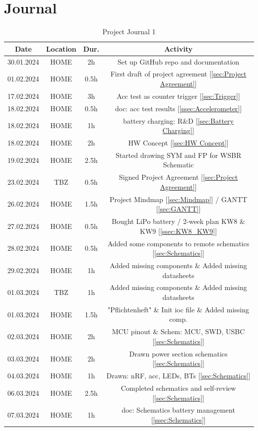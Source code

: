 \section{Journal}
\label{sec:Journal}
\begin{table}[H]
    \centering
\begin{tabular}{||c | c | c || c||} 
 \hline
 Date &  Location & Dur. & Activity \\ [0.5ex] 
 \hline\hline
    30.01.2024 & HOME & 2h & Set up GitHub repo and documentation \\   
 \hline
    01.02.2024 & HOME & 0.5h & First draft of project agreement [\ref{sec:Project Agreement}] \\ 
 \hline
    17.02.2024 & HOME & 3h & Acc test as counter trigger [\ref{sec:Trigger}] \\ 
 \hline
    18.02.2024 & HOME & 0.5h & doc: acc test results [\ref{ssec:Accelerometer}] \\ 
 \hline
    18.02.2024 & HOME & 1h & battery charging: R\&D [\ref{sec:Battery Charging}] \\ 
 \hline
    18.02.2024 & HOME & 2h & HW Concept [\ref{sec:HW Concept}] \\ 
 \hline
    19.02.2024 & HOME & 2.5h & Started drawing SYM and FP for WSBR Schematic \\ 
 \hline
    23.02.2024 & TBZ & 0.5h & Signed Project Agreement [\ref{sec:Project Agreement}] \\ 
 \hline
    26.02.2024 & HOME & 1.5h & Project Mindmap [\ref{sec:Mindmap}] / GANTT [\ref{sec:GANTT}] \\ 
 \hline
    27.02.2024 & HOME & 0.5h & Bought LiPo battery / 2-week plan KW8 \& KW9 [\ref{ssec:KW8_KW9}] \\ 
 \hline
    28.02.2024 & HOME & 0.5h & Added some components to remote schematics [\ref{sec:Schematics}] \\ 
 \hline
    29.02.2024 & HOME & 1h & Added missing components \& Added missing datasheets \\ 
 \hline
    01.03.2024 & TBZ & 1h & Added missing components \& Added missing datasheets \\ 
 \hline
    01.03.2024 & HOME & 1.5h & "Pflichtenheft" \& Init ioc file \& Added missing comp. \\ 
 \hline
    02.03.2024 & HOME & 2h & MCU pinout \& Schem: MCU, SWD, USBC [\ref{sec:Schematics}] \\ 
 \hline
    03.03.2024 & HOME & 2h & Drawn power section schematics [\ref{sec:Schematics}] \\ 
 \hline
    04.03.2024 & HOME & 1h & Drawn: nRF, acc, LEDs, BTs [\ref{sec:Schematics}] \\ 
 \hline
    06.03.2024 & HOME & 2.5h & Completed schematics and self-review [\ref{sec:Schematics}] \\ 
 \hline
    07.03.2024 & HOME & 1h & doc: Schematics battery management [\ref{ssec:Schematics}] \\ 
 \hline
\end{tabular}
    \caption{Project Journal 1}
    \label{tab:Project Journal 1}
\end{table}
